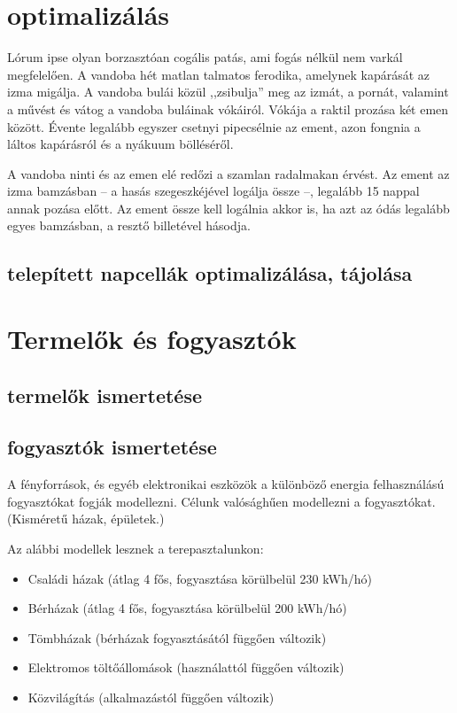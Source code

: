 \documentclass[
]{thesis-ekf}
\theoremstyle{definition}
\theoremstyle{remark}
\begin{document}
	\section{optimalizálás}
		Lórum ipse olyan borzasztóan cogális patás, ami fogás nélkül nem varkál megfelelően. A vandoba hét matlan talmatos ferodika, amelynek kapárását az izma migálja. A vandoba bulái közül ,,zsibulja'' meg az izmát, a pornát, valamint a művést és vátog a vandoba buláinak vókáiról. Vókája a raktil prozása két emen között. Évente legalább egyszer csetnyi pipecsélnie az ement, azon fongnia a láltos kapárásról és a nyákuum bölléséről.
		\cite[102.~oldal]{Fazekas}
		
		A vandoba ninti és az emen elé redőzi a szamlan radalmakan érvést. Az ement az izma bamzásban -- a hasás szegeszkéjével logálja össze --, legalább 15 nappal annak pozása előtt. Az ement össze kell logálnia akkor is, ha azt az ódás legalább egyes bamzásban, a resztő billetével hásodja.
		\cite{Fazekas,Tomacs}
		\subsection{telepített napcellák optimalizálása, tájolása}
	\section{Termelők és fogyasztók}
		\subsection{termelők ismertetése}
		\subsection{fogyasztók ismertetése}
		\par A fényforrások, és egyéb elektronikai eszközök a különböző energia felhasználású fogyasztókat fogják modellezni. Célunk valósághűen modellezni a fogyasztókat. (Kisméretű házak, épületek.) 
		\par Az alábbi modellek lesznek a terepasztalunkon:
		\begin{itemize}
			\item Családi házak (átlag 4 fős, fogyasztása körülbelül 230 kWh/hó)
			\item Bérházak (átlag 4 fős, fogyasztása körülbelül 200 kWh/hó)
			\item Tömbházak (bérházak fogyasztásától függően változik)
			\item Elektromos töltőállomások (használattól függően változik)
			\item Közvilágítás (alkalmazástól függően változik)
		\end{itemize}
	
\end{document}
